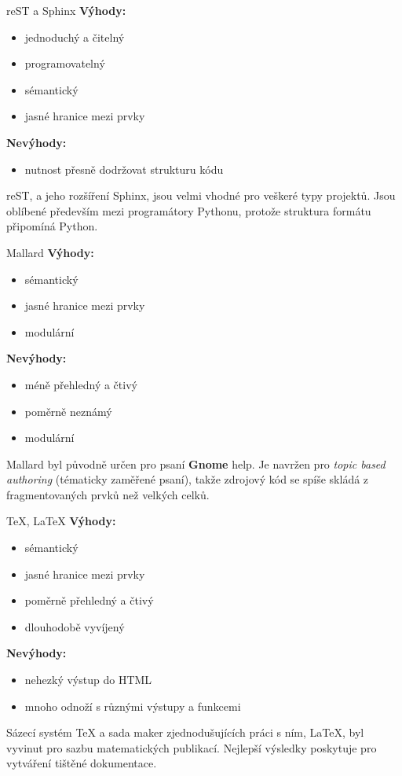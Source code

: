 \documentclass[12pt]{beamer}
\begin{document}
	\begin{frame}{reST a Sphinx}
	\textbf{Výhody:}
	\begin{itemize}
		\item jednoduchý a čitelný
		\item programovatelný
		\item sémantický
		\item jasné hranice mezi prvky
	\end{itemize}	
	\textbf{Nevýhody:}
	\begin{itemize}
		\item nutnost přesně dodržovat strukturu kódu
	\end{itemize}				
	reST, a jeho rozšíření Sphinx, jsou velmi vhodné pro veškeré typy projektů. Jsou oblíbené především mezi programátory Pythonu, protože struktura formátu připomíná Python.
	\end{frame}

	\begin{frame}{Mallard}
	\textbf{Výhody:}
	\begin{itemize}
		\item sémantický
		\item jasné hranice mezi prvky
		\item modulární
	\end{itemize}	
	\textbf{Nevýhody:}
	\begin{itemize}
		\item méně přehledný a čtivý
		\item poměrně neznámý
		\item modulární
	\end{itemize}				
	Mallard byl původně určen pro psaní \textbf{Gnome} help. Je navržen pro \textit{topic based authoring} (tématicky zaměřené psaní), takže zdrojový kód se spíše skládá z fragmentovaných prvků než velkých celků.
	\end{frame}

	\begin{frame}{\TeX, \LaTeX}
	\textbf{Výhody:}
	\begin{itemize}
		\item sémantický
		\item jasné hranice mezi prvky
		\item poměrně přehledný a čtivý
		\item dlouhodobě vyvíjený
	\end{itemize}	
	\textbf{Nevýhody:}
	\begin{itemize}
		\item nehezký výstup do HTML
		\item mnoho odnoží s různými výstupy a funkcemi
	\end{itemize}				
	Sázecí systém \TeX{} a sada maker zjednodušujících práci s ním, \LaTeX, byl vyvinut pro sazbu matematických publikací. Nejlepší výsledky poskytuje pro vytváření tištěné dokumentace. 
	\end{frame}
\end{document}
